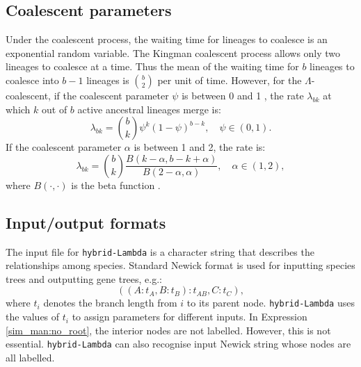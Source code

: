 \subsection{Coalescent parameters}
Under the coalescent process, the waiting time for lineages to coalesce is an exponential random variable. The Kingman coalescent process allows only two lineages to coalesce at a time. Thus the mean of the waiting time for $b$ lineages to coalesce into $b-1$ lineages is $\binom{b}{2}$ per unit of time. However, for the $\Lambda$-coalescent, if the coalescent parameter $\psi$ is between 0 and 1 \citep{Eldon2006}, the rate $\lambda_{bk}$
at which $k$ out of $b$ active ancestral lineages merge is:
\begin{equation}
\label{sim_man:eqn:psi}
\lambda_{bk}=\binom{b}{k}\psi^k(1-\psi)^{b-k},\quad \psi \in (0,1).
\end{equation}
If the coalescent parameter $\alpha$ is between 1
and 2, the rate is:
\begin{equation}
\label{sim_man:eqn:alpha}
\lambda_{bk}=\binom{b}{k}\frac{B(k-\alpha,b-k+\alpha)}{B(2-\alpha,\alpha)}, \quad \alpha \in (1,2),
\end{equation}
where $B(\cdot,\cdot)$  is the beta function \citep{Schweinsberg2003}.

\subsection{Input/output formats}\label{sim_man:input}
The input file for {\tt hybrid-Lambda} is a character string that describes the relationships among species. Standard Newick format \citep{Olsen1990} is used for inputting species trees and outputting
gene trees, e.g.:
\begin{equation}
((A:t_A,B:t_B):t_{AB},C:t_C)\label{sim_man:no_root},
\end{equation}
where $t_i$ denotes the branch length from $i$ to its parent node. {\tt hybrid-Lambda} uses the values of $t_i$ to assign parameters for different inputs. In Expression \eqref{sim_man:no_root}, the interior nodes are not labelled. However, this is not essential. {\tt hybrid-Lambda} can also recognise input Newick string whose nodes are all labelled.

